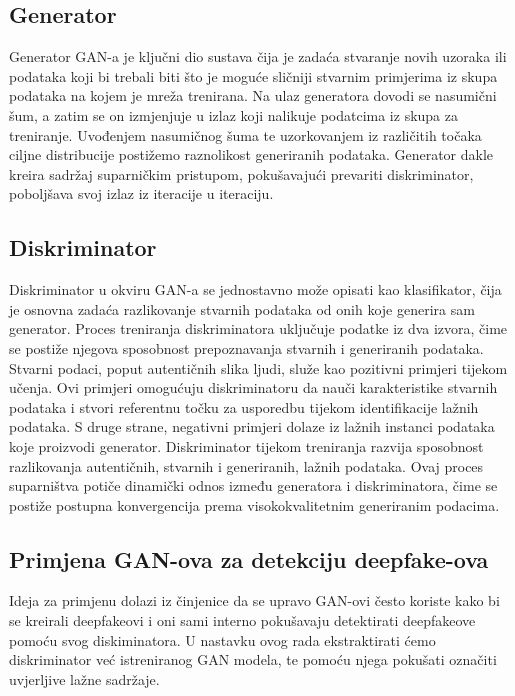 \documentclass[seminarski, times, utf8]{fer}
\begin{document}
\subsection{Generator}
Generator GAN-a je ključni dio sustava čija je zadaća stvaranje novih uzoraka ili podataka koji bi trebali biti što je moguće sličniji stvarnim primjerima iz skupa podataka na kojem je mreža trenirana. 
Na ulaz generatora dovodi se nasumični šum, a zatim se on izmjenjuje u izlaz koji nalikuje podatcima iz skupa za treniranje. Uvođenjem nasumičnog šuma te uzorkovanjem iz različitih točaka ciljne distribucije postižemo raznolikost generiranih podataka.
Generator dakle kreira sadržaj suparničkim pristupom, pokušavajući prevariti diskriminator, poboljšava svoj izlaz iz iteracije u iteraciju.

\subsection{Diskriminator}
Diskriminator u okviru GAN-a se jednostavno može opisati kao klasifikator, čija je osnovna zadaća razlikovanje stvarnih podataka od onih koje generira sam generator. Proces treniranja diskriminatora uključuje podatke iz dva izvora, čime se postiže njegova sposobnost prepoznavanja stvarnih i generiranih podataka. Stvarni podaci, poput autentičnih slika ljudi, služe kao pozitivni primjeri tijekom učenja. Ovi primjeri omogućuju diskriminatoru da nauči karakteristike stvarnih podataka i stvori referentnu točku za usporedbu tijekom identifikacije lažnih podataka. S druge strane, negativni primjeri dolaze iz lažnih instanci podataka koje proizvodi generator. Diskriminator tijekom treniranja razvija sposobnost razlikovanja autentičnih, stvarnih i generiranih, lažnih podataka. Ovaj proces suparništva potiče dinamički odnos između generatora i diskriminatora, čime se postiže postupna konvergencija prema visokokvalitetnim generiranim podacima.

\subsection {Primjena GAN-ova za detekciju deepfake-ova}
Ideja za primjenu dolazi iz činjenice da se upravo GAN-ovi često koriste kako bi se kreirali deepfakeovi i oni sami interno pokušavaju detektirati deepfakeove pomoću svog diskiminatora. 
U nastavku ovog rada ekstraktirati ćemo diskriminator već istreniranog GAN modela, te pomoću njega pokušati označiti uvjerljive lažne sadržaje. 

\end{document}
